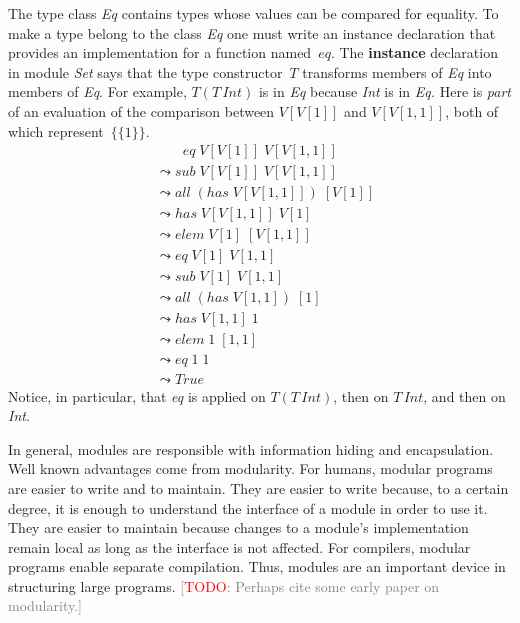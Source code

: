 \documentclass[conference,compsoc]{IEEEtran} %
\newcommand{\todo}[1]{{\small \textcolor{gray}{[\textcolor{red}{TODO}: #1]}}}
\begin{document}

The type class \textit{Eq} contains types whose values can be compared for
equality. To make a type belong to the class \textit{Eq} one must write an
instance declaration that provides an implementation for a function
named~$eq$. The \textbf{instance} declaration in module \textit{Set} says
that the type constructor~$T$ transforms members of \textit{Eq} into
members of \textit{Eq}. For example, $T(T\,\mathit{Int})$ is in \textit{Eq}
because \textit{Int} is in \textit{Eq.} Here is \emph{part} of an
evaluation of the comparison between $V[V[1]]$ and $V[V[1,1]]$, both of
which represent~$\{\{1\}\}$.
\begin{align*}
&\phantom{\;\leadsto\;}
  \mathit{eq}\;V[V[1]]\;V[V[1,1]] \\
&\leadsto
  \mathit{sub}\;V[V[1]]\;V[V[1,1]]\\
&\leadsto
  \mathit{all}\;(\mathit{has}\;V[V[1,1]])\;[V[1]]\\
&\leadsto
  \mathit{has}\;V[V[1,1]]\;V[1]\\
&\leadsto
  \mathit{elem}\;V[1]\;[V[1,1]]\\
&\leadsto
  \mathit{eq}\;V[1]\;V[1,1]\\
&\leadsto
  \mathit{sub}\;V[1]\;V[1,1]\\
&\leadsto
  \mathit{all}\;(\mathit{has}\;V[1,1])\;[1]\\
&\leadsto
  \mathit{has}\;V[1,1]\;1 \\
&\leadsto
  \mathit{elem}\;1\;[1,1]\\
&\leadsto
  \mathit{eq}\;1\;1\\
&\leadsto
  \mathit{True}
\end{align*}
Notice, in particular, that \textit{eq} is applied on $T(T\,\mathit{Int})$,
then on $T\,\mathit{Int}$, and then on \textit{Int}.

In general, modules are responsible with information hiding and
encapsulation. Well known advantages come from modularity. For humans,
modular programs are easier to write and to maintain. They are easier to
write because, to a certain degree, it is enough to understand the
interface of a module in order to use it. They are easier to maintain
because changes to a module's implementation remain local as long as the
interface is not affected. For compilers, modular programs enable separate
compilation. Thus, modules are an important device in structuring large
programs. \todo{Perhaps cite some early paper on modularity.}
\end{document}
